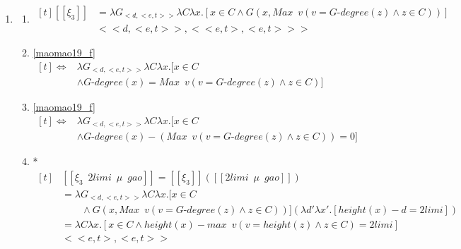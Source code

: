 \documentclass{ctexart}
\begin{document}
\begin{enumerate}
    \item \label{maomao20}
    \begin{enumerate}
        \item \label{maomao20_b}
        $\begin{aligned}[t]
            [\![\xi_3]\!] &= \lambda G_{<d,<e,t>>} \lambda C \lambda x. [x \in C \land G(x,Max \enspace v(v=G \mbox{-} degree(z) \land z \in C))] \\
            & <<d,<e,t>>, <<e,t>,<e,t>>>
        \end{aligned}$

        \item \label{maomao20_c}
        \ref{maomao19_f} 
        $\begin{aligned}[t]
            \Leftrightarrow &\lambda G_{<d,<e,t>>} \lambda C \lambda x. [x \in C \\
            & \land G \mbox{-} degree(x)=Max \enspace v(v=G \mbox{-} degree(z) \land z \in C)]
        \end{aligned}$

        \item \label{maomao20_d}
        \ref{maomao19_f} 
        $\begin{aligned}[t]
            \Leftrightarrow &\lambda G_{<d,<e,t>>} \lambda C \lambda x. [x \in C \\
            & \land G \mbox{-} degree(x) - (Max \enspace v(v=G \mbox{-} degree(z) \land z \in C)) = 0]
        \end{aligned}$

        \item \label{maomao20_e}
        * $\begin{aligned}[t]
            &[\![\xi_3 \enspace 2 limi \enspace \mu \enspace gao]\!] = [\![\xi_3]\!]([\![2 limi \enspace \mu \enspace gao]\!]) \\
            &= \lambda G_{<d,<e,t>>}\lambda C \lambda x. [x \in C \\
            &\qquad \land G(x,Max \enspace v(v=G \mbox{-} degree(z) \land z \in C))](\lambda d' \lambda x'.[height(x)-d=2limi]) \\
            &=\lambda C \lambda x.[x \in C \land height(x)-max \enspace v(v=height(z) \land z \in C)=2limi]\\
            & <<e,t>,<e,t>>
        \end{aligned}$

    \end{enumerate}
\end{enumerate}
\end{document}

